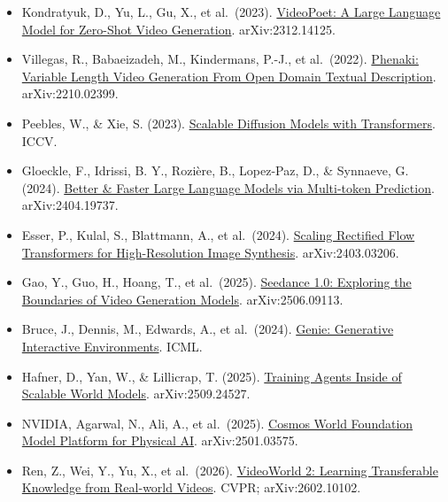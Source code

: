 \vspace{0.25em}
\begin{itemize}
\tightlist
\item
  Kondratyuk, D., Yu, L., Gu, X., et al.~(2023). \href{https://arxiv.org/abs/2312.14125}{VideoPoet: A Large Language Model for Zero-Shot Video Generation}. arXiv:2312.14125.
\item
  Villegas, R., Babaeizadeh, M., Kindermans, P.-J., et al.~(2022). \href{https://arxiv.org/abs/2210.02399}{Phenaki: Variable Length Video Generation From Open Domain Textual Description}. arXiv:2210.02399.
\item
  Peebles, W., \& Xie, S. (2023). \href{https://arxiv.org/abs/2212.09748}{Scalable Diffusion Models with Transformers}. ICCV.
\item
  Gloeckle, F., Idrissi, B. Y., Rozière, B., Lopez-Paz, D., \& Synnaeve, G. (2024). \href{https://arxiv.org/abs/2404.19737}{Better \& Faster Large Language Models via Multi-token Prediction}. arXiv:2404.19737.
\item
  Esser, P., Kulal, S., Blattmann, A., et al.~(2024). \href{https://arxiv.org/abs/2403.03206}{Scaling Rectified Flow Transformers for High-Resolution Image Synthesis}. arXiv:2403.03206.
\item
  Gao, Y., Guo, H., Hoang, T., et al.~(2025). \href{https://arxiv.org/abs/2506.09113}{Seedance 1.0: Exploring the Boundaries of Video Generation Models}. arXiv:2506.09113.
\item
  Bruce, J., Dennis, M., Edwards, A., et al.~(2024). \href{https://arxiv.org/abs/2402.15391}{Genie: Generative Interactive Environments}. ICML.
\item
  Hafner, D., Yan, W., \& Lillicrap, T. (2025). \href{https://arxiv.org/abs/2509.24527}{Training Agents Inside of Scalable World Models}. arXiv:2509.24527.
\item
  NVIDIA, Agarwal, N., Ali, A., et al.~(2025). \href{https://arxiv.org/abs/2501.03575}{Cosmos World Foundation Model Platform for Physical AI}. arXiv:2501.03575.
\item
  Ren, Z., Wei, Y., Yu, X., et al.~(2026). \href{https://arxiv.org/abs/2602.10102}{VideoWorld 2: Learning Transferable Knowledge from Real-world Videos}. CVPR; arXiv:2602.10102.
\end{itemize}

\clearpage
